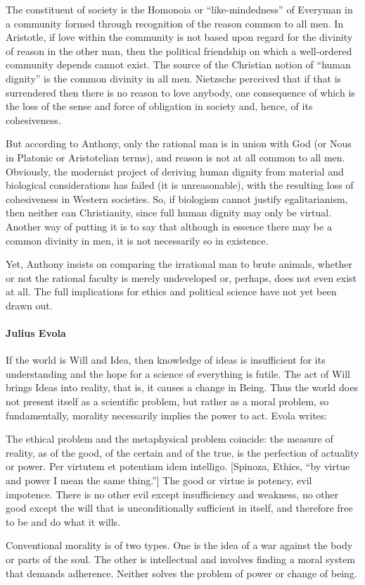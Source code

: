 \begin{quotex}
The constituent of society is the Homonoia or “like-mindedness” of Everyman in a community formed through recognition of the reason common to all men. In Aristotle, if love within the community is not based upon regard for the divinity of reason in the other man, then the political friendship on which a well-ordered community depends cannot exist. The source of the Christian notion of “human dignity” is the common divinity in all men. Nietzsche perceived that if that is surrendered then there is no reason to love anybody, one consequence of which is the loss of the sense and force of obligation in society and, hence, of its cohesiveness. 

\end{quotex}
But according to Anthony, only the rational man is in union with God (or Nous in Platonic or Aristotelian terms), and reason is not at all common to all men. Obviously, the modernist project of deriving human dignity from material and biological considerations has failed (it is unreasonable), with the resulting loss of cohesiveness in Western societies. So, if biologism cannot justify egalitarianism, then neither can Christianity, since full human dignity may only be virtual. Another way of putting it is to say that although in essence there may be a common divinity in men, it is not necessarily so in existence.

Yet, Anthony insists on comparing the irrational man to brute animals, whether or not the rational faculty is merely undeveloped or, perhaps, does not even exist at all. The full implications for ethics and political science have not yet been drawn out.

\paragraph{Julius Evola}
If the world is Will and Idea, then knowledge of ideas is insufficient for its understanding and the hope for a science of everything is futile. The act of Will brings Ideas into reality, that is, it causes a change in Being. Thus the world does not present itself as a scientific problem, but rather as a moral problem, so fundamentally, morality necessarily implies the power to act. Evola writes:

\begin{quotex}
The ethical problem and the metaphysical problem coincide: the measure of reality, as of the good, of the certain and of the true, is the perfection of actuality or power. Per virtutem et potentiam idem intelligo. [Spinoza, Ethics, “by virtue and power I mean the same thing.”] The good or virtue is potency, evil impotence. There is no other evil except insufficiency and weakness, no other good except the will that is unconditionally sufficient in itself, and therefore free to be and do what it wills.

\end{quotex}
Conventional morality is of two types. One is the idea of a war against the body or parts of the soul. The other is intellectual and involves finding a moral system that demands adherence. Neither solves the problem of power or change of being.

